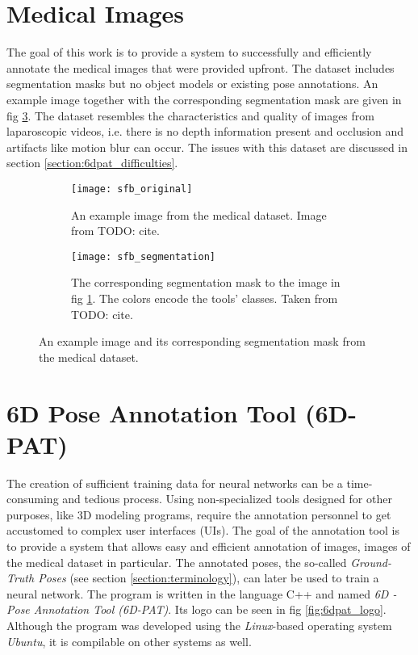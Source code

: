 \section{Medical Images}

The goal of this work is to provide a system to successfully and efficiently annotate the medical images that were provided upfront. The dataset includes segmentation masks but no object models or existing pose annotations. An example image together with the corresponding segmentation mask are given in fig \ref{fig:sfb}. The dataset resembles the characteristics and quality of images from laparoscopic videos, i.e. there is no depth information present and occlusion and artifacts like motion blur can occur. The issues with this dataset are discussed in section \ref{section:6dpat_difficulties}. 

\begin{figure}[!tbp]
	\centering
	\begin{subfigure}[t]{0.47\textwidth}
	\centering
    	\texttt{[image: sfb\_original]}
    	\caption{An example image from the medical dataset. Image from TODO: cite.}
    	\label{fig:sfb_original}
	\end{subfigure}
	\hfill
	\begin{subfigure}[t]{0.47\textwidth}
	\centering
    	\texttt{[image: sfb\_segmentation]}
    	\caption{The corresponding segmentation mask to the image in fig \ref{fig:sfb_original}. The colors encode the tools' classes. Taken from TODO: cite.}
    	\label{fig:sfb_segmentation}
	\end{subfigure}
	\caption{An example image and its corresponding segmentation mask from the medical dataset.}
	\label{fig:sfb}
\end{figure} 

\section{6D Pose Annotation Tool (6D-PAT)}

The creation of sufficient training data for neural networks can be a time-consuming and tedious process. Using non-specialized tools designed for other purposes, like 3D modeling programs, require the annotation personnel to get accustomed to complex user interfaces (UIs). The goal of the annotation tool is to provide a system that allows easy and efficient annotation of images, images of the medical dataset in particular. The annotated poses, the so-called \textit{Ground-Truth Poses} (see section \ref{section:terminology}), can later be used to train a neural network. The program is written in the language C++ and named \textit{6D - Pose Annotation Tool (6D-PAT)}. Its logo can be seen in fig \ref{fig:6dpat_logo}. Although the program was developed using the \textit{Linux}-based operating system \textit{Ubuntu}, it is compilable on other systems as well.

